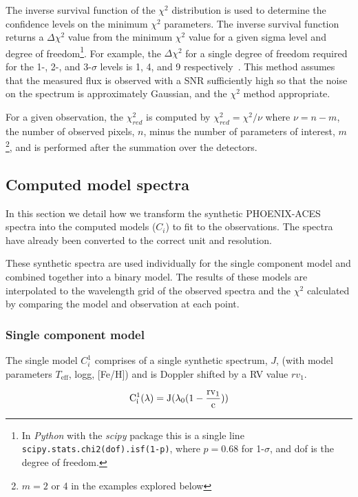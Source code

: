 \documentclass[fleqn,usenatbib]{mnras}
\begin{document}
The inverse survival function of the \(\chi^2\) distribution is used to determine the confidence levels on the minimum \(\chi^2\) parameters. The inverse survival function returns a \(\Delta\chi^2\) value from the minimum \(\chi^2\) value for a given sigma level and degree of freedom\footnote{In \emph{Python} with the \emph{scipy} package this is a single line \texttt{scipy.stats.chi2(dof).isf(1-p)}, where \(p = 0.68\) for 1-\(\sigma\), and dof is the degree of freedom.}. 
For example, the \(\Delta \chi^2\) for a single degree of freedom required for the 1-, 2-, and 3-\(\sigma\) levels is 1, 4, and 9 respectively~\cite{bevington_data_2003}. This method assumes that the measured flux is observed with a SNR sufficiently high so that the noise on the spectrum is approximately Gaussian, and the \(\chi^2\) method appropriate.

For a given observation, the \(\chi^{2}_{red}\) is computed by \(\chi^2_{red} = \chi^2 / \nu \) where \(\nu = n - m\), the number of observed pixels, \(n\), minus the number of parameters of interest, \(m\)\footnote{\(m=2\) or 4 in the examples explored below}, and is performed after the summation over the detectors.


\subsection{Computed model spectra}
\label{models}
In this section we detail how we transform the synthetic PHOENIX-ACES spectra into the computed models (\(C_i\)) to fit to the observations. The spectra have already been converted to the correct unit and resolution.

These synthetic spectra are used individually for the single component model and combined together into a binary model. The results of these models are interpolated to the wavelength grid of the observed spectra and the \(\chi^{2} \) calculated by comparing the model and observation at each point.


\subsubsection{Single component model}
\label{subsubsec:single-model}
The single model \(C^{1}_{i}\) comprises of a single synthetic spectrum, \(J\), (with model parameters \(T_{\textrm{eff}}\), logg, [Fe/H]) and is Doppler shifted by a RV value \({rv}_1\). 

\begin{equation}
\rm C^{1}_{i}(\lambda) = J(\lambda_0(1-\frac{{rv}_1}{c}))
\end{equation}
\end{document}
